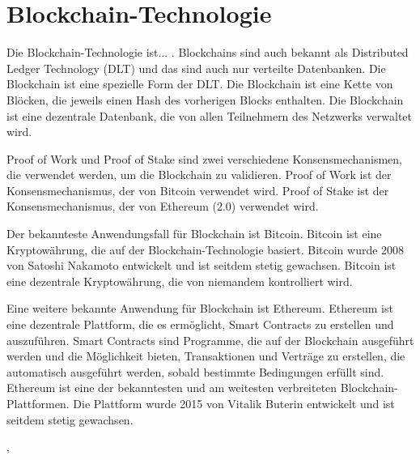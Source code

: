 \section{Blockchain-Technologie}
Die Blockchain-Technologie ist... . Blockchains sind auch bekannt als Distributed Ledger 
Technology (DLT) und das sind auch nur verteilte Datenbanken. Die Blockchain ist eine
spezielle Form der DLT. Die Blockchain ist eine Kette von Blöcken, die jeweils einen
Hash des vorherigen Blocks enthalten. Die Blockchain ist eine dezentrale Datenbank, die
von allen Teilnehmern des Netzwerks verwaltet wird.

Proof of Work und Proof of Stake sind zwei verschiedene Konsensmechanismen, die verwendet
werden, um die Blockchain zu validieren. Proof of Work ist der Konsensmechanismus, der
von Bitcoin verwendet wird. Proof of Stake ist der Konsensmechanismus, der von Ethereum (2.0)
verwendet wird.

Der bekannteste Anwendungsfall für Blockchain ist Bitcoin. Bitcoin ist eine Kryptowährung,
die auf der Blockchain-Technologie basiert. Bitcoin wurde 2008 von Satoshi Nakamoto entwickelt
und ist seitdem stetig gewachsen. Bitcoin ist eine dezentrale Kryptowährung, die von niemandem
kontrolliert wird.

Eine weitere bekannte Anwendung für Blockchain ist Ethereum. Ethereum ist eine dezentrale
Plattform, die es ermöglicht, Smart Contracts zu erstellen und auszuführen. Smart Contracts
sind Programme, die auf der Blockchain ausgeführt werden und die Möglichkeit bieten, Transaktionen und
Verträge zu erstellen, die automatisch ausgeführt werden, sobald bestimmte Bedingungen erfüllt sind.
Ethereum ist eine der bekanntesten und am weitesten verbreiteten Blockchain-Plattformen. Die Plattform
wurde 2015 von Vitalik Buterin entwickelt und ist seitdem stetig gewachsen.



‚
